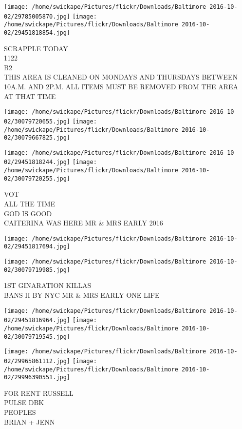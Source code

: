 \documentclass[10pt,letterpaper]{article}
\begin{document}
\texttt{[image: /home/swickape/Pictures/flickr/Downloads/Baltimore 2016-10-02/29785005870.jpg]}
\texttt{[image: /home/swickape/Pictures/flickr/Downloads/Baltimore 2016-10-02/29451818854.jpg]}

SCRAPPLE TODAY\\
1122\\
B2\\
THIS AREA IS CLEANED ON MONDAYS AND THURSDAYS BETWEEN 10A.M. AND 2P.M. ALL ITEMS MUST BE REMOVED FROM THE AREA AT THAT TIME
\pagebreak

\texttt{[image: /home/swickape/Pictures/flickr/Downloads/Baltimore 2016-10-02/30079720655.jpg]}
\texttt{[image: /home/swickape/Pictures/flickr/Downloads/Baltimore 2016-10-02/30079667825.jpg]}

\texttt{[image: /home/swickape/Pictures/flickr/Downloads/Baltimore 2016-10-02/29451818244.jpg]}
\texttt{[image: /home/swickape/Pictures/flickr/Downloads/Baltimore 2016-10-02/30079720255.jpg]}

VOT\\
ALL THE TIME\\
GOD IS GOOD\\
CAITERINA WAS HERE MR \& MRS EARLY 2016
\pagebreak

\texttt{[image: /home/swickape/Pictures/flickr/Downloads/Baltimore 2016-10-02/29451817694.jpg]}

\vspace{0.25in}
\texttt{[image: /home/swickape/Pictures/flickr/Downloads/Baltimore 2016-10-02/30079719985.jpg]}

1ST GINARATION KILLAS\\
BANS II BY NYC MR \& MRS EARLY ONE LIFE
\pagebreak

\texttt{[image: /home/swickape/Pictures/flickr/Downloads/Baltimore 2016-10-02/29451816964.jpg]}
\texttt{[image: /home/swickape/Pictures/flickr/Downloads/Baltimore 2016-10-02/30079719545.jpg]}

\texttt{[image: /home/swickape/Pictures/flickr/Downloads/Baltimore 2016-10-02/29965861112.jpg]}
\texttt{[image: /home/swickape/Pictures/flickr/Downloads/Baltimore 2016-10-02/29996390551.jpg]}

FOR RENT RUSSELL\\
PULSE DBK\\
PEOPLES\\
BRIAN + JENN
\pagebreak
\end{document}
